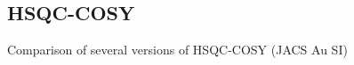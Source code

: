 \subsection{HSQC-COSY}
\label{subsec:noah__hsqccosy}

Comparison of several versions of HSQC-COSY (JACS Au SI)

